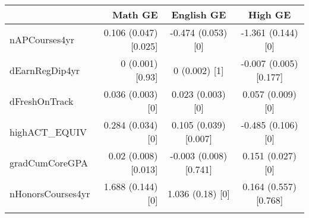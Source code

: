 
\begin{tabular}{lrcc}
\toprule{}
  & Math GE & English GE & High GE\\
\midrule{}
nAPCourses4yr & 0.106 (0.047) [0.025] & -0.474 (0.053) [0] & -1.361 (0.144) [0]\\
dEarnRegDip4yr & 0 (0.001) [0.93] & 0 (0.002) [1] & -0.007 (0.005) [0.177]\\
dFreshOnTrack & 0.036 (0.003) [0] & 0.023 (0.003) [0] & 0.057 (0.009) [0]\\
highACT\_EQUIV & 0.284 (0.034) [0] & 0.105 (0.039) [0.007] & -0.485 (0.106) [0]\\
gradCumCoreGPA & 0.02 (0.008) [0.013] & -0.003 (0.008) [0.741] & 0.151 (0.027) [0]\\
\addlinespace
nHonorsCourses4yr & 1.688 (0.144) [0] & 1.036 (0.18) [0] & 0.164 (0.557) [0.768]\\
\bottomrule{}
\end{tabular}
